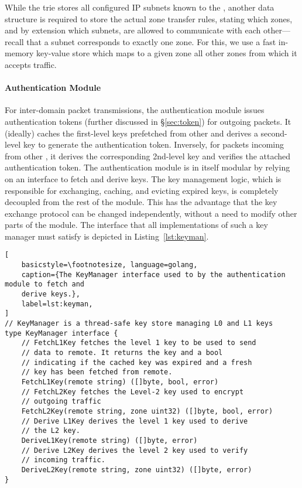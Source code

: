 While the trie stores all configured IP subnets known to the \tp, another data structure is required
to store the actual zone transfer rules, stating which zones, and by extension which subnets, are
allowed to communicate with each other---recall that a subnet corresponds to exactly one zone. For this,
we use a fast in-memory key-value store which maps to a given zone all other zones from which it
accepts traffic.

\paragraph{Authentication Module}
For inter-domain packet transmissions, the authentication module issues
authentication tokens (further discussed in \S\ref{sec:token}) for outgoing packets.
It (ideally) caches the first-level keys prefetched
from other \tps and derives a second-level key to generate the authentication token. Inversely, for
packets incoming from other \tps, it derives the corresponding 2nd-level key
and verifies the attached authentication token. The authentication module is in itself modular by
relying on an interface to fetch and derive keys. The key management logic, which is
responsible for exchanging, caching, and evicting expired keys, is completely
decoupled from the rest of the module. This has the advantage that the key exchange protocol can be changed
independently, without a need to modify other parts of the module. The interface that all
implementations of such a key manager must satisfy is depicted in Listing~\ref{lst:keyman}.

\begin{minipage}{\linewidth}
	\begin{lstlisting}[
	basicstyle=\footnotesize, language=golang,
	caption={The KeyManager interface used to by the authentication module to fetch and
	derive keys.},
	label=lst:keyman,
]
// KeyManager is a thread-safe key store managing L0 and L1 keys
type KeyManager interface {
	// FetchL1Key fetches the level 1 key to be used to send
	// data to remote. It returns the key and a bool
	// indicating if the cached key was expired and a fresh
	// key has been fetched from remote.
	FetchL1Key(remote string) ([]byte, bool, error)
	// FetchL2Key fetches the Level-2 key used to encrypt
	// outgoing traffic
	FetchL2Key(remote string, zone uint32) ([]byte, bool, error)
	// Derive L1Key derives the level 1 key used to derive
	// the L2 key.
	DeriveL1Key(remote string) ([]byte, error)
	// Derive L2Key derives the level 2 key used to verify
	// incoming traffic.
	DeriveL2Key(remote string, zone uint32) ([]byte, error)
}
	\end{lstlisting}
\end{minipage}

